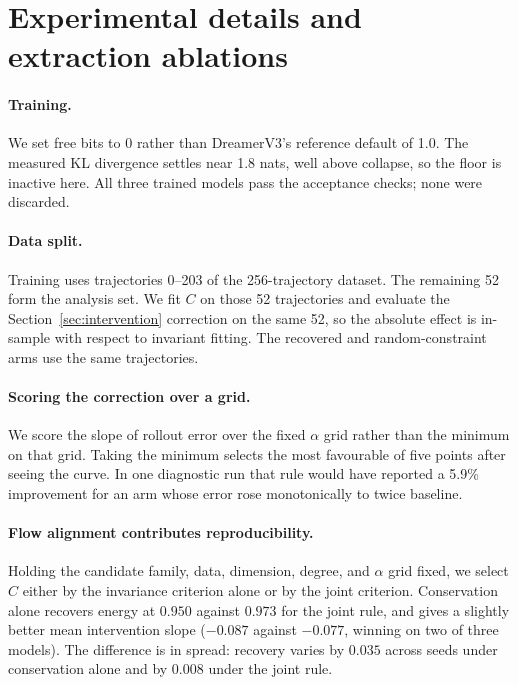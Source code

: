 \appendix

\section{Experimental details and extraction ablations}
\label{sec:details}

\paragraph{Training.} We set free bits to 0 rather than DreamerV3's reference default of 1.0. The
measured KL divergence settles near 1.8 nats, well above collapse, so the floor is inactive here. All
three trained models pass the acceptance checks; none were discarded.

\paragraph{Data split.} Training uses trajectories 0--203 of the 256-trajectory dataset. The
remaining 52 form the analysis set. We fit $C$ on those 52 trajectories and evaluate the
Section~\ref{sec:intervention} correction on the same 52, so the absolute effect is in-sample with
respect to invariant fitting. The recovered and random-constraint arms use the same trajectories.

\paragraph{Scoring the correction over a grid.} We score the slope of rollout error over the fixed
$\alpha$ grid rather than the minimum on that grid. Taking the minimum selects the most favourable of
five points after seeing the curve. In one diagnostic run that rule would have reported a 5.9\%
improvement for an arm whose error rose monotonically to twice baseline.

\paragraph{Flow alignment contributes reproducibility.} Holding the candidate family, data,
dimension, degree, and $\alpha$ grid fixed, we select $C$ either by the invariance criterion alone or
by the joint criterion. Conservation alone recovers energy at $0.950$ against $0.973$ for the joint
rule, and gives a slightly better mean intervention slope ($-0.087$ against $-0.077$, winning on two
of three models). The difference is in spread: recovery varies by $0.035$ across seeds under
conservation alone and by $0.008$ under the joint rule.


